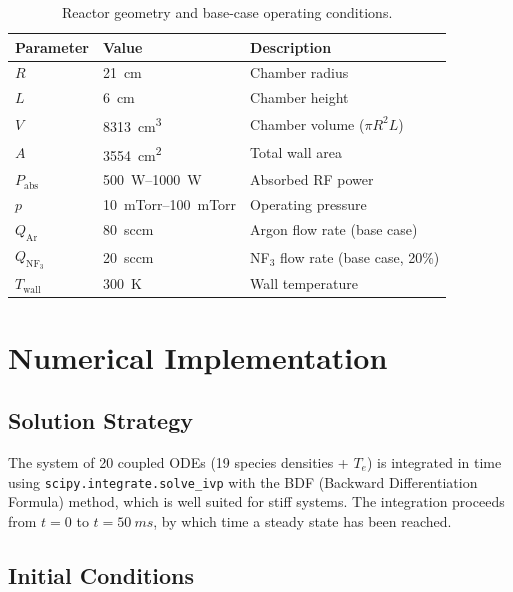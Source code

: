 \documentclass[11pt,a4paper]{article}
\newcommand{\Te}{\ensuremath{T_e}}
\begin{document}
\begin{table}[H]
  \centering
  \caption{Reactor geometry and base-case operating conditions.}
  \label{tab:reactor}
  \begin{tabular}{lll}
    \toprule
    \textbf{Parameter} & \textbf{Value} & \textbf{Description} \\
    \midrule
    $R$           & \SI{21}{cm}    & Chamber radius \\
    $L$           & \SI{6}{cm}     & Chamber height \\
    $V$           & \SI{8313}{cm^3} & Chamber volume ($\pi R^2 L$) \\
    $A$           & \SI{3554}{cm^2} & Total wall area \\
    $P_{\text{abs}}$ & \SIrange{500}{1000}{W} & Absorbed RF power \\
    $p$           & \SIrange{10}{100}{mTorr} & Operating pressure \\
    $Q_{\text{Ar}}$  & \SI{80}{sccm} & Argon flow rate (base case) \\
    $Q_{\text{NF}_3}$ & \SI{20}{sccm} & NF$_3$ flow rate (base case, 20\%) \\
    $T_{\text{wall}}$ & \SI{300}{K}   & Wall temperature \\
    \bottomrule
  \end{tabular}
\end{table}


\section{Numerical Implementation}
\label{sec:numerics}

\subsection{Solution Strategy}

The system of 20 coupled ODEs (19 species densities + $\Te$) is integrated in
time using \texttt{scipy.integrate.solve\_ivp} with the BDF (Backward
Differentiation Formula) method, which is well suited for stiff systems. The
integration proceeds from $t = 0$ to $t = \SI{50}{ms}$, by which time a steady
state has been reached.

\subsection{Initial Conditions}
\end{document}
